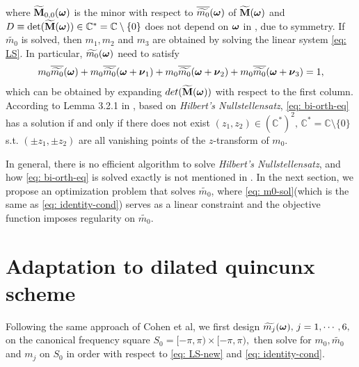 where $\widetilde{\mathbf{M}}_{0,0}(\boldsymbol{\omega})$ is the minor with respect to $\overline{\widetilde{m_{0}}}(\boldsymbol{\omega})$ of $\widetilde{\mathbf{M}}(\boldsymbol{\omega})$ and $ D \equiv \det(\widetilde{\mathbf{M}}(\boldsymbol{\omega}))\in \mathbb{C}^* = \mathbb{C}\setminus\{0\}$ does not depend on $\boldsymbol{\omega}$ in \cite{cohen1993compactly}, due to symmetry.
If $\widetilde{m_0}$ is solved, then $m_1,m_2$ and $m_3$ are obtained by solving the linear system \eqref{eq: LS}.
In particular, $\widetilde{m_{0}}(\boldsymbol{\omega})$ need to satisfy 
\begin{align}\label{eq: bi-orth-eq}
m_0\overline{\widetilde{m_{0}}}(\boldsymbol{\omega}) + m_0\overline{\widetilde{m_{0}}}(\boldsymbol{\omega} + \boldsymbol{\nu}_{1}) + m_0\overline{\widetilde{m_{0}}}(\boldsymbol{\omega} + \boldsymbol{\nu}_{2}) + m_0\overline{\widetilde{m_{0}}}(\boldsymbol{\omega} + \boldsymbol{\nu}_{3}) = 1,
\end{align}
which can be obtained by expanding $det(\widetilde{\mathbf{M}}(\boldsymbol{\omega}))$ with respect to the first column.
According to Lemma 3.2.1 in \cite{cohen1993compactly}, based on {\it Hilbert's Nullstellensatz}, \eqref{eq: bi-orth-eq} has a solution if and only if there does not exist $(z_1,z_2)\in (\mathbb{C}^*)^2,\, \mathbb{C}^* = \mathbb{C}\setminus\{0\}$\, s.t. $(\pm z_1,\pm z_2)$ are all 
vanishing points of the $z$-transform of $m_0$.

In general, there is no efficient algorithm to solve {\it Hilbert's Nullstellensatz}, and how \eqref{eq: bi-orth-eq} is solved exactly is not mentioned in \cite{cohen1993compactly}.
In the next section, we propose an optimization problem that solves $\widetilde{m_0}$, where \eqref{eq: m0-sol}(which is the same as \eqref{eq: identity-cond}) serves as a linear constraint and the objective function imposes regularity on $\widetilde{m_0}$.


\section{Adaptation to dilated quincunx scheme}\label{sec: solve-quincunx}

Following the same approach of Cohen et al, we first design $\widetilde{m_{j}}(\boldsymbol{\omega}),\,j = 1,\cdots,6,$ on the canonical frequency square $S_0 = [-\pi,\pi)\times[-\pi,\pi),$ then solve for $m_0,\widetilde{m_0}$ and $m_j$ on $S_0$ in order with respect to \eqref{eq: LS-new} and \eqref{eq: identity-cond}.

